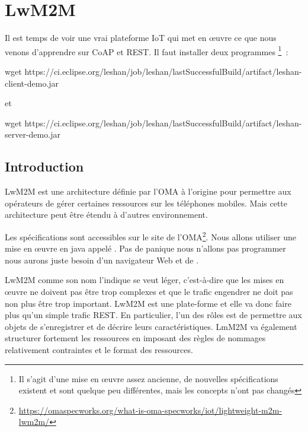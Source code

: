 \chapter{LwM2M}

Il est temps de voir une vrai plateforme IoT qui met en œuvre ce que nous venons d'apprendre sur CoAP et REST. Il faut installer deux programmes \footnote{Il s'agit d'une mise en œuvre assez ancienne, de nouvelles spécifications existent et sont quelque peu différentes, mais les concepts n'ont pas changés}~:

\begin{termc}[backgroundcolor=\color{verttelecom!30}, basicstyle=\ttfamily\tiny, escapechar=@]
wget https://ci.eclipse.org/leshan/job/leshan/lastSuccessfulBuild/artifact/leshan-client-demo.jar
\end{termc}

\noindent et

\begin{termc}[backgroundcolor=\color{verttelecom!30}, basicstyle=\ttfamily\tiny, escapechar=@]
wget https://ci.eclipse.org/leshan/job/leshan/lastSuccessfulBuild/artifact/leshan-server-demo.jar
\end{termc}

\section{Introduction}

\ac{LwM2M} est une architecture définie par l'\ac{OMA} à l'origine pour permettre aux opérateurs de gérer certaines ressources sur les téléphones mobiles. Mais cette architecture peut être étendu à d'autres environnement. 

         \vspace{1em}

Les spécifications sont accessibles sur le site de l'OMA\footnote{\url{https://omaspecworks.org/what-is-oma-specworks/iot/lightweight-m2m-lwm2m/}}. Nous allons utiliser une mise en œuvre en java appelé . Pas de panique nous n'allons pas programmer nous aurons juste besoin d'un navigateur Web et de .

         \vspace{1em}

\ac{LwM2M} comme son nom l'indique se veut léger, c'est-à-dire que les mises en œuvre ne doivent pas être trop complexes et que le trafic engendrer ne doit pas non plus être trop important. LwM2M est une plate-forme et elle va donc faire plus qu'un simple trafic REST. En particulier, l'un des rôles est de permettre aux objets de s'enregistrer et de décrire leurs caractéristiques. LmM2M va également structurer fortement les ressources en imposant des règles de nommages relativement contraintes et le format des ressources.

